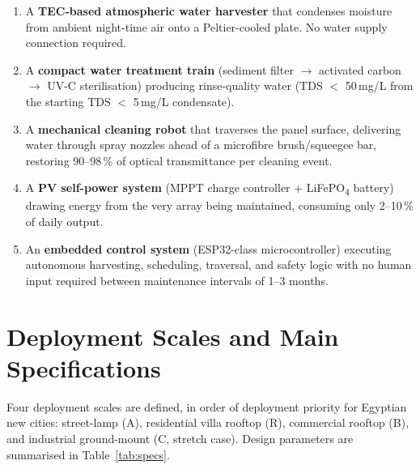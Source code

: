 \documentclass[12pt,a4paper]{report}
\numberwithin{equation}{chapter}
\numberwithin{figure}{chapter}
\numberwithin{table}{chapter}
\begin{document}
\begin{enumerate}[leftmargin=*, label=(\roman*)]
  \item A \textbf{TEC-based atmospheric water harvester} that condenses moisture from
        ambient night-time air onto a Peltier-cooled plate. No water supply connection
        required.
  \item A \textbf{compact water treatment train} (sediment filter $\rightarrow$ activated
        carbon $\rightarrow$ UV-C sterilisation) producing rinse-quality water
        (TDS $<$ 50\,mg/L from the starting TDS $<$ 5\,mg/L condensate).
  \item A \textbf{mechanical cleaning robot} that traverses the panel surface, delivering
        water through spray nozzles ahead of a microfibre brush/squeegee bar, restoring
        90--98\,\% of optical transmittance per cleaning event.
  \item A \textbf{PV self-power system} (MPPT charge controller + LiFePO\textsubscript{4}
        battery) drawing energy from the very array being maintained, consuming only
        2--10\,\% of daily output.
  \item An \textbf{embedded control system} (ESP32-class microcontroller) executing
        autonomous harvesting, scheduling, traversal, and safety logic with no human
        input required between maintenance intervals of 1--3 months.
\end{enumerate}

\section{Deployment Scales and Main Specifications}

Four deployment scales are defined, in order of deployment priority for Egyptian
new cities: street-lamp (A), residential villa rooftop (R), commercial rooftop (B),
and industrial ground-mount (C, stretch case). Design parameters are summarised in
Table~\ref{tab:specs}.
\end{document}
